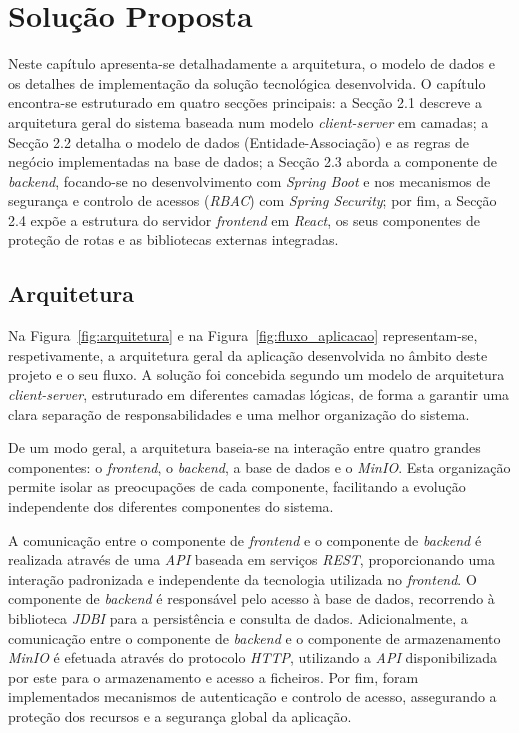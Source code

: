 %
%
\chapter{Solu\c{c}\~{a}o Proposta} \label{cap:solucao}

Neste capítulo apresenta-se detalhadamente a arquitetura, o modelo de dados e os detalhes de implementação da solução tecnológica desenvolvida.
O capítulo encontra-se estruturado em quatro secções principais: a Secção 2.1 descreve a arquitetura geral do sistema baseada num modelo \textit{client-server} em camadas; a Secção 2.2 detalha o modelo de dados (Entidade-Associação) e as regras de negócio implementadas na base de dados; a Secção 2.3 aborda a componente de \textit{backend}, focando-se no desenvolvimento com \textit{Spring Boot} e nos mecanismos de segurança e controlo de acessos (\textit{RBAC}) com \textit{Spring Security}; por fim, a Secção 2.4 expõe a estrutura do servidor \textit{frontend} em \textit{React}, os seus componentes de proteção de rotas e as bibliotecas externas integradas.

\section{Arquitetura}

Na Figura~\ref{fig:arquitetura} e na Figura~\ref{fig:fluxo_aplicacao} representam-se, respetivamente, a arquitetura geral da aplicação desenvolvida no âmbito deste projeto e o seu fluxo. A solução foi concebida segundo um modelo de arquitetura \textit{client-server}, estruturado em diferentes camadas lógicas, de forma a garantir uma clara separação de responsabilidades e uma melhor organização do sistema.

De um modo geral, a arquitetura baseia-se na interação entre quatro grandes componentes: o \textit{frontend}, o \textit{backend}, a base de dados e o \textit{MinIO}. Esta organização permite isolar as preocupações de cada componente, facilitando a evolução independente dos diferentes componentes do sistema.

A comunicação entre o componente de \textit{frontend} e o componente de \textit{backend} é realizada através de uma \textit{API} baseada em serviços \textit{REST}, proporcionando uma interação padronizada e independente da tecnologia utilizada no \textit{frontend}. O componente de \textit{backend} é responsável pelo acesso à base de dados, recorrendo à biblioteca \textit{JDBI}\cite{jdbi} para a persistência e consulta de dados. Adicionalmente, a comunicação entre o componente de \textit{backend} e o componente de armazenamento \textit{MinIO} é efetuada através do protocolo \textit{HTTP}, utilizando a \textit{API} disponibilizada por este para o armazenamento e acesso a ficheiros. Por fim, foram implementados mecanismos de autenticação e controlo de acesso, assegurando a proteção dos recursos e a segurança global da aplicação.

